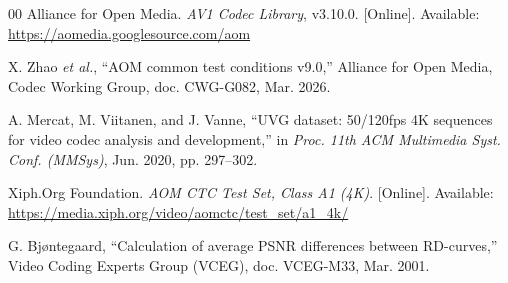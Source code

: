 \documentclass[conference]{IEEEtran}
\begin{document}
\begin{thebibliography}{00}
 Alliance for Open Media. \emph{AV1 Codec Library}, v3.10.0. [Online]. Available: \url{https://aomedia.googlesource.com/aom}

 X. Zhao \emph{et al.}, ``AOM common test conditions v9.0,'' Alliance for Open Media, Codec Working Group, doc. CWG-G082, Mar. 2026.

 A. Mercat, M. Viitanen, and J. Vanne, ``UVG dataset: 50/120fps 4K sequences for video codec analysis and development,'' in \emph{Proc. 11th ACM Multimedia Syst. Conf. (MMSys)}, Jun. 2020, pp. 297--302.

 Xiph.Org Foundation. \emph{AOM CTC Test Set, Class A1 (4K)}. [Online]. Available: \url{https://media.xiph.org/video/aomctc/test_set/a1_4k/}

 G. Bj{\o}ntegaard, ``Calculation of average PSNR differences between RD-curves,'' Video Coding Experts Group (VCEG), doc. VCEG-M33, Mar. 2001.

\end{thebibliography}
\end{document}
